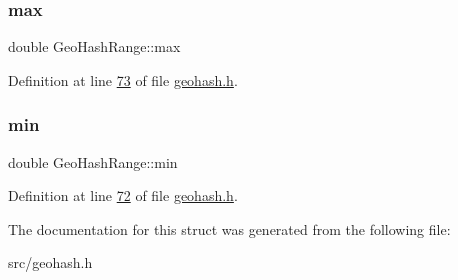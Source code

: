 \subsubsection{\texorpdfstring{max}{max}}
{\footnotesize\ttfamily double Geo\+Hash\+Range\+::max}



Definition at line \hyperlink{geohash_8h_source_l00073}{73} of file \hyperlink{geohash_8h_source}{geohash.\+h}.

\mbox{\label{structGeoHashRange_a554624a58afd7784b4759b6b7aa51ce1}} 
\subsubsection{\texorpdfstring{min}{min}}
{\footnotesize\ttfamily double Geo\+Hash\+Range\+::min}



Definition at line \hyperlink{geohash_8h_source_l00072}{72} of file \hyperlink{geohash_8h_source}{geohash.\+h}.



The documentation for this struct was generated from the following file\+:\begin{DoxyCompactItemize}
\item 
src/geohash.\+h\end{DoxyCompactItemize}
